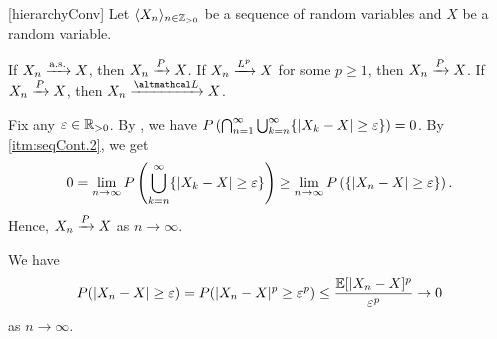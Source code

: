 \documentclass[../probability.tex]{subfiles}
\begin{document}
\begin{Theorem}{}[hierarchyConv]
    Let \(\lang X_n \rang_{n \in \ZZ_{>0}}\) be a sequence of random variables
    and \(X\) be a random variable.
    \begin{enumerate}[label=(\arabic*), ref=\protect{\Cref{th:hierarchyConv} (\arabic*)}]
        \ii\label{itm:hierarchyConv.1}
        If \(X_n \xrightarrow{\mathrm{a.s.}} X\), then \(X_n \xrightarrow{P} X\).
        \ii\label{itm:hierarchyConv.2}
        If \(X_n \xrightarrow{L^p} X\) for some \(p \ge 1\), then \(X_n \xrightarrow{P} X\).
        \ii\label{itm:hierarchyConv.3}
        If \(X_n \xrightarrow{P} X\), then \(X_n \lawconv X\).
    \end{enumerate}
\end{Theorem}
\begin{myproof}[Proof]\hfill
\begin{enumerate}[label=(\alph*)]
    \ii
    Fix any \(\veps \in \RR_{>0}\). By ,
    we have \(P \left( \bigcap_{n=1}^\infty \bigcup_{k=n}^\infty \{|X_k - X| \ge \varepsilon\} \right) = 0\).
    By \ref{itm:seqCont.2}, we get
    \[
        0 = \lim_{n \to \infty} P \left( \bigcup_{k=n}^\infty \{|X_k - X| \ge \varepsilon\} \right)
        \ge \lim_{n \to \infty} P \left( \{|X_n - X| \ge \varepsilon\} \right)\text.
    \]
    Hence, \(X_n \xrightarrow{P} X\) as \(n \to \infty\).

    \ii
    We have
    \[
        P(|X_n - X| \ge \varepsilon)
        = P(|X_n - X|^p \ge \varepsilon^p) \le \frac{\mathbb{E}[|X_n-X]^p}{\varepsilon^p} \to 0
    \]
    as \(n \to \infty\).


\end{enumerate}
\end{myproof}
\end{document}
